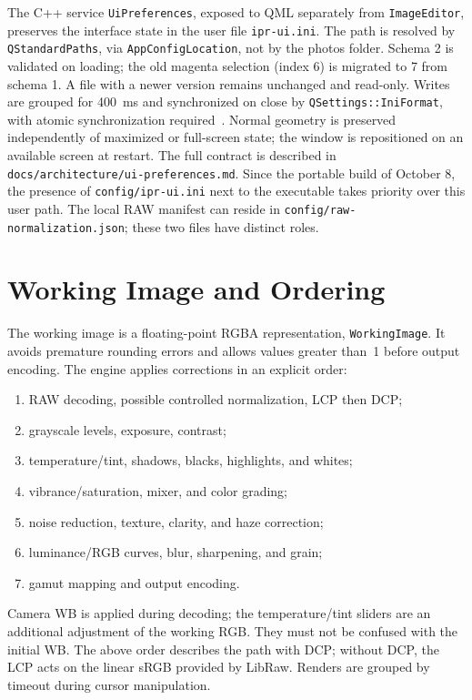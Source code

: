 The C++ service \texttt{UiPreferences}, exposed to QML separately from \texttt{ImageEditor}, preserves the interface state in the user file \texttt{ipr-ui.ini}. The path is resolved by \texttt{QStandardPaths}, via \texttt{AppConfigLocation}, not by the photos folder. Schema 2 is validated on loading; the old magenta selection (index 6) is migrated to 7 from schema 1. A file with a newer version remains unchanged and read-only. Writes are grouped for 400~ms and synchronized on close by \texttt{QSettings::IniFormat}, with atomic synchronization required~\cite{qtQSettings,qtQStandardPaths}. Normal geometry is preserved independently of maximized or full-screen state; the window is repositioned on an available screen at restart. The full contract is described in \texttt{docs/architecture/ui-preferences.md}. Since the portable build of October 8, the presence of \texttt{config/ipr-ui.ini} next to the executable takes priority over this user path. The local RAW manifest can reside in \texttt{config/raw-normalization.json}; these two files have distinct roles.

\section{Working Image and Ordering}

The working image is a floating-point RGBA representation, \texttt{WorkingImage}. It avoids premature rounding errors and allows values greater than~1 before output encoding. The engine applies corrections in an explicit order:

\begin{enumerate}
  \item RAW decoding, possible controlled normalization, LCP then DCP;
  \item grayscale levels, exposure, contrast;
  \item temperature/tint, shadows, blacks, highlights, and whites;
  \item vibrance/saturation, mixer, and color grading;
  \item noise reduction, texture, clarity, and haze correction;
  \item luminance/RGB curves, blur, sharpening, and grain;
  \item gamut mapping and output encoding.
\end{enumerate}

Camera WB is applied during decoding; the temperature/tint sliders are an additional adjustment of the working RGB. They must not be confused with the initial WB. The above order describes the path with DCP; without DCP, the LCP acts on the linear sRGB provided by LibRaw. Renders are grouped by timeout during cursor manipulation.

